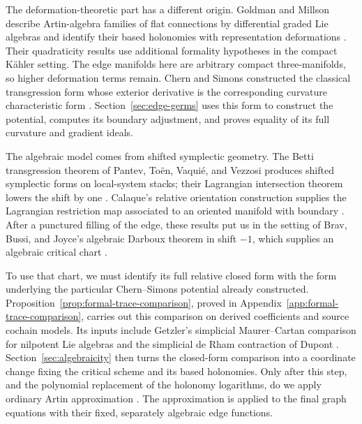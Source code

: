 The deformation-theoretic part has a different origin. Goldman and
Millson describe Artin-algebra families of flat connections by differential
graded Lie algebras and identify their based holonomies with representation
deformations \cite[Corollary~6.4 and Proposition~6.6]{GM1988}.
Their quadraticity results use additional formality hypotheses in the
compact K\"ahler setting. The edge manifolds here are arbitrary compact
three-manifolds, so higher deformation terms remain.
Chern and Simons constructed the classical transgression form whose
exterior derivative is the corresponding curvature characteristic form
\cite[Section~3, especially Proposition~3.2]{ChernSimons1974}.
Section~\ref{sec:edge-germs} uses this form to construct the potential,
computes its boundary adjustment, and proves equality of its full
curvature and gradient ideals.

The algebraic model comes from shifted symplectic geometry. The Betti
transgression theorem of Pantev, To\"en, Vaqui\'e, and Vezzosi produces
shifted symplectic forms on local-system stacks; their Lagrangian
intersection theorem lowers the shift by one
\cite[Theorems~2.5 and~2.9]{PTVV2013}.
Calaque's relative orientation construction supplies the Lagrangian
restriction map associated to an oriented manifold with boundary
\cite[Theorem~2.9 and \S3.1]{Calaque2015}.
After a punctured filling of the edge, these results put us in the
setting of Brav, Bussi, and Joyce's algebraic Darboux theorem in
shift \(-1\), which supplies an algebraic critical chart
\cite[Example~5.15 and Theorem~5.18(i)]{BBJ2019}.

To use that chart, we must identify its full relative closed form with
the form underlying the particular Chern--Simons potential already
constructed. Proposition~\ref{prop:formal-trace-comparison}, proved in
Appendix~\ref{app:formal-trace-comparison}, carries out this comparison
on derived coefficients and source cochain models. Its inputs include
Getzler's simplicial Maurer--Cartan comparison for nilpotent Lie algebras
\cite[Theorem~5.4 and Corollary~5.11]{Getzler2009} and the simplicial
de Rham contraction of Dupont \cite{Dupont1976}.
Section~\ref{sec:algebraicity} then turns the closed-form comparison
into a coordinate change fixing the critical scheme and its based
holonomies. Only after this step, and the polynomial replacement of the
holonomy logarithms, do we apply ordinary Artin approximation
\cite[Theorem~1.10]{Artin1969}. The approximation is applied to the
final graph equations with their fixed, separately algebraic edge
functions.

